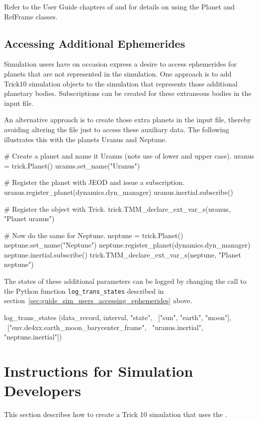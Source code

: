 Refer to the User Guide chapters of
and  for details
on using the Planet and RefFrame classes.

\subsection{Accessing Additional Ephemerides}
\label{sec:guide_sim_users_accessing_additional_ephemerides}
Simulation users have on occasion express a desire to access ephemerides
for planets that are not represented in the simulation. One approach is
to add Trick10 simulation objects to the simulation that represents those
additional planetary bodies. Subscriptions can be created for these
extraneous bodies in the input file.

An alternative approach is to create those extra planets in the input file,
thereby avoiding altering the \Sdefine file just to access these auxiliary
data. The following illustrates this with the planets Uranus and Neptune.
\begin{codeblock}
# Create a planet and name it Uranus (note use of lower and upper case).
uranus = trick.Planet()
uranus.set_name("Uranus")

# Register the planet with JEOD and issue a subscription.
uranus.register_planet(dynamics.dyn_manager)
uranus.inertial.subscribe()

# Register the object with Trick.
trick.TMM_declare_ext_var_s(uranus, "Planet uranus")

# Now do the same for Neptune.
neptune = trick.Planet()
neptune.set_name("Neptune")
neptune.register_planet(dynamics.dyn_manager)
neptune.inertial.subscribe()
trick.TMM_declare_ext_var_s(neptune, "Planet neptune")
\end{codeblock}

The states of these additional parameters can be logged by changing
the call to the Python function \verb|log_trans_states| described
in section~\ref{sec:guide_sim_users_accessing_ephemerides} above.
\begin{codeblock}
log_trans_states (data_record, interval, "state", \
                  ["sun", "earth", "moon"], \
                  ["env.de4xx.earth_moon_barycenter_frame", \
                   "uranus.inertial", "neptune.inertial"])
\end{codeblock}


\section{Instructions for Simulation Developers}
\label{sec:guide_sim_developers}
This section describes how to create a Trick 10 simulation
that uses the \ModelDesc.


